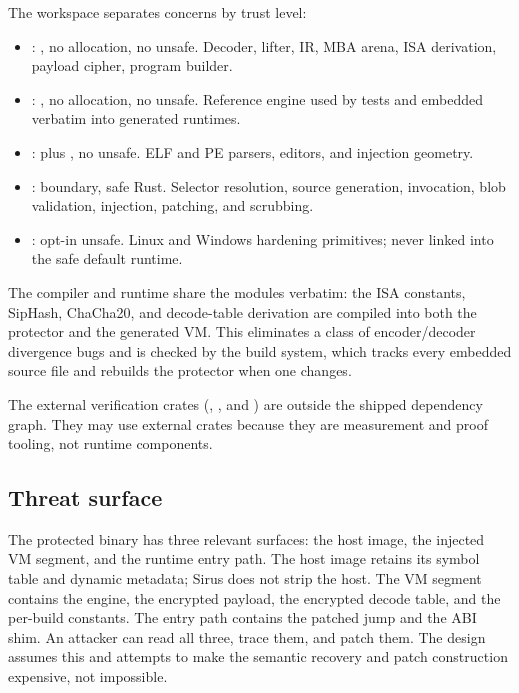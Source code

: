 The workspace separates concerns by trust level:

\begin{itemize}
  \item {}: , no allocation, no unsafe. Decoder,
        lifter, IR, MBA arena, ISA derivation, payload cipher, program builder.
  \item {}: , no allocation, no unsafe. Reference
        engine used by tests and embedded verbatim into generated runtimes.
  \item {}:  plus , no unsafe. ELF and
        PE parsers, editors, and injection geometry.
  \item {}:  boundary, safe Rust. Selector
        resolution, source generation,  invocation, blob validation,
        injection, patching, and scrubbing.
  \item {}: opt-in unsafe. Linux and Windows hardening
        primitives; never linked into the safe default runtime.
\end{itemize}

The compiler and runtime share the  modules verbatim: the ISA
constants, SipHash, ChaCha20, and decode-table derivation are compiled into both
the protector and the generated VM. This eliminates a class of encoder/decoder
divergence bugs and is checked by the build system, which tracks every embedded
source file and rebuilds the protector when one changes.

The external verification crates (,
, and ) are outside the shipped dependency
graph. They may use external crates because they are measurement and proof
tooling, not runtime components.

\subsection{Threat surface}

The protected binary has three relevant surfaces: the host image, the injected
VM segment, and the runtime entry path. The host image retains its symbol table
and dynamic metadata; Sirus does not strip the host. The VM segment contains the
engine, the encrypted payload, the encrypted decode table, and the per-build
constants. The entry path contains the patched jump and the ABI shim. An
attacker can read all three, trace them, and patch them. The design assumes this
and attempts to make the semantic recovery and patch construction expensive, not
impossible.
